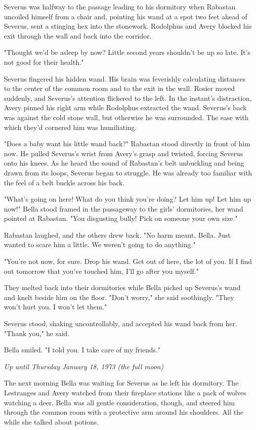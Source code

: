 \documentclass[a4paper,11pt]{article}
\begin{document}
Severus was halfway to the passage leading to his dormitory when Rabastan uncoiled himself from a chair and, pointing his wand at a spot two feet ahead of Severus, sent a stinging hex into the stonework. Rodolphus and Avery blocked his exit through the wall and back into the corridor.

"Thought we'd be asleep by now? Little second years shouldn't be up so late. It's not good for their health."

Severus fingered his hidden wand. His brain was feverishly calculating distances to the center of the common room and to the exit in the wall. Rosier moved suddenly, and Severus's attention flickered to the left. In the instant's distraction, Avery pinned his right arm while Rodolphus extracted the wand. Severus's back was against the cold stone wall, but otherwise he was surrounded. The ease with which they'd cornered him was humiliating.

"Does a baby want his little wand back?" Rabastan stood directly in front of him now. He pulled Severus's wrist from Avery's grasp and twisted, forcing Severus onto his knees. As he heard the sound of Rabastan's belt unbuckling and being drawn from its loops, Severus began to struggle. He was already too familiar with the feel of a belt buckle across his back.

"What's going on here! What do you think you're doing? Let him up! Let him up now!" Bella stood framed in the passageway to the girls' dormitories, her wand pointed at Rabastan. "You disgusting bully! Pick on someone your own size."

Rabastan laughed, and the others drew back. "No harm meant, Bella. Just wanted to scare him a little. We weren't going to do anything."

"You're not now, for sure. Drop his wand. Get out of here, the lot of you. If I find out tomorrow that you've touched him, I'll go after you myself."

They melted back into their dormitories while Bella picked up Severus's wand and knelt beside him on the floor. "Don't worry," she said soothingly. "They won't hurt you. I won't let them."

Severus stood, shaking uncontrollably, and accepted his wand back from her. "Thank you," he said.

Bella smiled. "I told you. I take care of my friends."

\emph{Up until Thursday January 18, 1973 (the full moon)}

The next morning Bella was waiting for Severus as he left his dormitory. The Lestranges and Avery watched from their fireplace stations like a pack of wolves watching a deer. Bella was all gentle consideration, though, and steered him through the common room with a protective arm around his shoulders. All the while she talked about potions.
\end{document}
